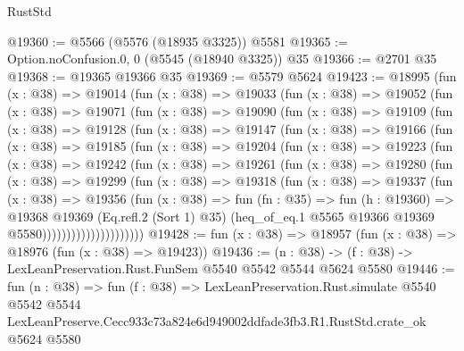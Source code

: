 \begin{lexlean}{RustStd}
\begin{coremodule}
@19360 := @5566 (@5576 (@18935 @3325)) @5581
@19365 := Option.noConfusion.{0, 0} (@5545 (@18940 @3325)) @35
@19366 := @2701 @35
@19368 := @19365 @19366 @35
@19369 := @5579 @5624
@19423 := @18995
    (fun (x : @38) =>
    @19014
      (fun (x : @38) =>
      @19033
        (fun (x : @38) =>
        @19052
          (fun (x : @38) =>
          @19071
            (fun (x : @38) =>
            @19090
              (fun (x : @38) =>
              @19109
                (fun (x : @38) =>
                @19128
                  (fun (x : @38) =>
                  @19147
                    (fun (x : @38) =>
                    @19166
                      (fun (x : @38) =>
                      @19185
                        (fun (x : @38) =>
                        @19204
                          (fun (x : @38) =>
                          @19223
                            (fun (x : @38) =>
                            @19242
                              (fun (x : @38) =>
                              @19261
                                (fun (x : @38) =>
                                @19280
                                  (fun (x : @38) =>
                                  @19299
                                    (fun (x : @38) =>
                                    @19318
                                      (fun (x : @38) =>
                                      @19337
                                        (fun (x : @38) =>
                                        @19356
                                          (fun (x : @38) =>
                                          fun (fn : @35) =>
                                          fun (h : @19360) =>
                                          @19368
                                            @19369
                                            (Eq.refl.{2} (Sort 1) @35)
                                            (heq_of_eq.{1}
                                              @5565
                                              @19366
                                              @19369
                                              @5580)))))))))))))))))))))
@19428 := fun (x : @38) => @18957 (fun (x : @38) => @18976 (fun (x : @38) => @19423))
@19436 := (n : @38) -> (f : @38) -> LexLeanPreservation.Rust.FunSem @5540 @5542 @5544 @5624 @5580
@19446 := fun (n : @38) =>
  fun (f : @38) =>
  LexLeanPreservation.Rust.simulate
    @5540
    @5542
    @5544
    LexLeanPreserve.Cecc933c73a824e6d949002ddfade3fb3.R1.RustStd.crate_ok
    @5624
    @5580
\end{coremodule}
\end{lexlean}
